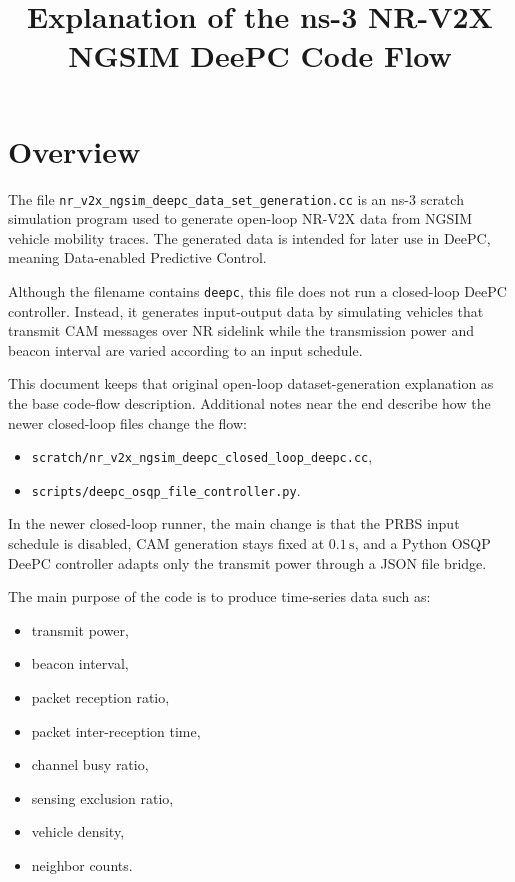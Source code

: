 \documentclass[11pt,a4paper]{article}
\title{Explanation of the ns-3 NR-V2X NGSIM DeePC Code Flow}
\author{}
\date{}
\begin{document}
\maketitle

\section{Overview}

The file \texttt{nr\_v2x\_ngsim\_deepc\_data\_set\_generation.cc} is an ns-3 scratch simulation program used to generate open-loop NR-V2X data from NGSIM vehicle mobility traces. The generated data is intended for later use in DeePC, meaning Data-enabled Predictive Control.

Although the filename contains \texttt{deepc}, this file does not run a closed-loop DeePC controller. Instead, it generates input-output data by simulating vehicles that transmit CAM messages over NR sidelink while the transmission power and beacon interval are varied according to an input schedule.

This document keeps that original open-loop dataset-generation explanation as the base code-flow description. Additional notes near the end describe how the newer closed-loop files change the flow:

\begin{itemize}
    \item \texttt{scratch/nr\_v2x\_ngsim\_deepc\_closed\_loop\_deepc.cc},
    \item \texttt{scripts/deepc\_osqp\_file\_controller.py}.
\end{itemize}

In the newer closed-loop runner, the main change is that the PRBS input schedule is disabled, CAM generation stays fixed at \(0.1\,\mathrm{s}\), and a Python OSQP DeePC controller adapts only the transmit power through a JSON file bridge.

The main purpose of the code is to produce time-series data such as:
\begin{itemize}
    \item transmit power,
    \item beacon interval,
    \item packet reception ratio,
    \item packet inter-reception time,
    \item channel busy ratio,
    \item sensing exclusion ratio,
    \item vehicle density,
    \item neighbor counts.
\end{itemize}
\end{document}
